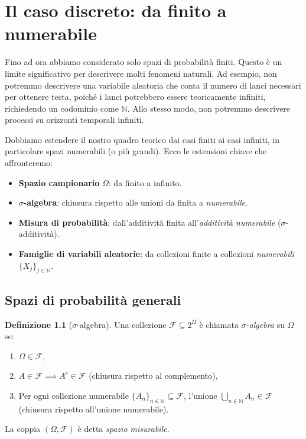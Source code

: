 \documentclass[11pt, a4paper]{report}
\theoremstyle{plain}
\theoremstyle{definition}
\newtheorem{definition}[theorem]{Definizione}
\theoremstyle{remark}
\newcommand{\F}{\mathcal{F}}
\newcommand{\N}{\mathbb{N}}
\newcommand{\1}{\mathbf{1}}
\begin{document}
\chapter{Il caso discreto: da finito a numerabile}

Fino ad ora abbiamo considerato solo spazi di probabilità finiti. Questo è un limite significativo per descrivere molti fenomeni naturali. Ad esempio, non potremmo descrivere una variabile aleatoria che conta il numero di lanci necessari per ottenere testa, poiché i lanci potrebbero essere teoricamente infiniti, richiedendo un codominio come $\N$. Allo stesso modo, non potremmo descrivere processi su orizzonti temporali infiniti. 

Dobbiamo estendere il nostro quadro teorico dai casi finiti ai casi infiniti, in particolare spazi numerabili (o più grandi). Ecco le estensioni chiave che affronteremo:
\begin{itemize}
    \item \textbf{Spazio campionario} $\Omega$: da finito a infinito.
    \item \textbf{$\sigma$-algebra}: chiusura rispetto alle unioni da finita a \emph{numerabile}.
    \item \textbf{Misura di probabilità}: dall'additività finita all'\emph{additività numerabile} ($\sigma$-additività).
    \item \textbf{Famiglie di variabili aleatorie}: da collezioni finite a collezioni \emph{numerabili} $\{X_j\}_{j \in \N}$.
\end{itemize}

\section{Spazi di probabilità generali}

\begin{definition}[$\sigma$-algebra]
Una collezione $\F \subseteq 2^\Omega$ è chiamata \emph{$\sigma$-algebra} su $\Omega$ se:
\begin{enumerate}
    \item $\Omega \in \F$,
    \item $A \in \F \implies A^c \in \F$ (chiusura rispetto al complemento),
    \item Per ogni collezione numerabile $\{A_n\}_{n \in \N} \subseteq \F$, l'unione $\bigcup_{n \in \N} A_n \in \F$ (chiusura rispetto all'unione numerabile).
\end{enumerate}
La coppia $(\Omega, \F)$ è detta \emph{spazio misurabile}.
\end{definition}
\end{document}
